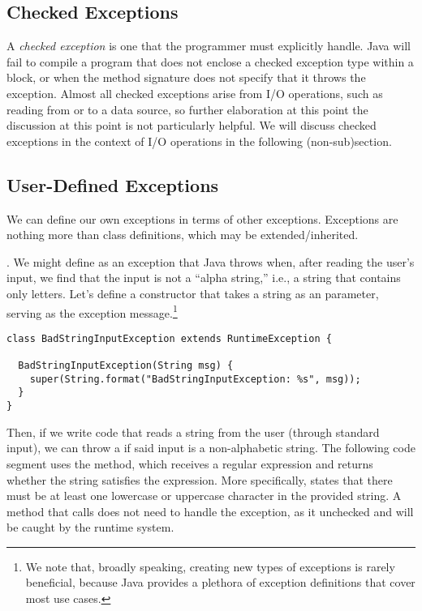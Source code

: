 \subsection{Checked Exceptions}

A \emph{checked exception} is one that the programmer must explicitly handle. 
Java will fail to compile a program that does not enclose a checked exception type within a  block, or when the method signature does not specify that it throws the exception. 
Almost all checked exceptions arise from I/O operations, such as reading from or to a data source, so further elaboration at this point the discussion at this point is not particularly helpful.
We will discuss checked exceptions in the context of I/O operations in the following (non-sub)section.

\subsection{User-Defined Exceptions}
We can define our own exceptions in terms of other exceptions. 
Exceptions are nothing more than class definitions, which may be extended/inherited. 

. 
We might define  as an exception that Java throws when, after reading the user's input, we find that the input is not a ``alpha string,'' i.e., a string that contains only letters. 
Let's define a constructor that takes a string as an parameter, serving as the exception message.\footnote{We note that, broadly speaking, creating new types of exceptions is rarely beneficial, because Java provides a plethora of exception definitions that cover most use cases.}

\begin{lstlisting}[language=MyJava]
class BadStringInputException extends RuntimeException {
  
  BadStringInputException(String msg) {
    super(String.format("BadStringInputException: %s", msg));
  }
}
\end{lstlisting}

Then, if we write code that reads a string from the user (through standard input), we can throw a  if said input is a non-alphabetic string. 
The following code segment uses the  method, which receives a regular expression and returns whether the string satisfies the expression. 
More specifically, \ttt{[a-zA-Z]+} states that there must be at least one lowercase or uppercase character in the provided string.
A method that calls  does not need to handle the exception, as it unchecked and will be caught by the runtime system.

